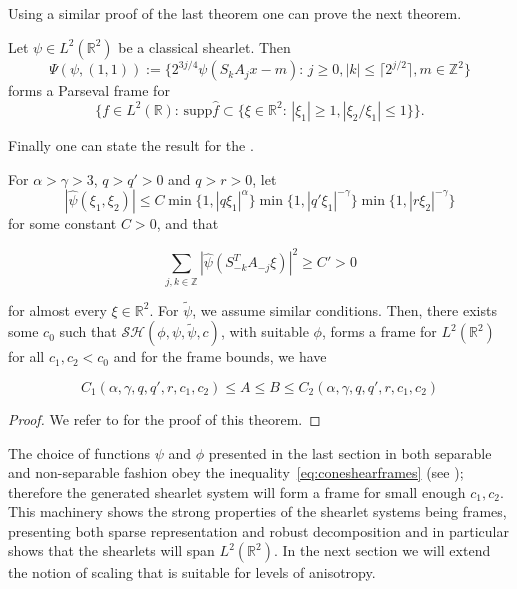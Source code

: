 Using a similar proof of the last theorem one can prove the next theorem.

\begin{thm}
Let $\psi\in L^2(\mathbb{R}^2)$ be a classical shearlet. Then 
$$
\Psi(\psi,(1,1)):=\{2^{3j/4}\psi(S_kA_jx-m)\text{: }j\geq 0,|k|\leq\lceil 2^{j/2}\rceil,m\in\mathbb{Z}^2\}
$$
forms a Parseval frame for 
$$
\{f\in L^2(\mathbb{R})\text{:  supp}\hat{f}\subset\{\xi\in\mathbb{R}^2\text{:  }|\xi_1|\geq 1,|\xi_2/\xi_1|\leq 1\}\}.
$$
\end{thm}

Finally one can state the result for the .

\begin{thm}
For $\alpha >\gamma>3$, $q>q'>0$ and $q>r>0$, let 
\begin{equation}
\label{eq:coneshearframes}
|\hat{\psi}(\xi_1,\xi_2)|\leq C\min\{1,|q\xi_1|^{\alpha}\}\min\{1,|q'\xi_1|^{-\gamma}\}\min\{1,|r\xi_2|^{-\gamma}\}
\end{equation}
for some constant $C>0$, and that

$$
\sum_{j,k\in\mathbb{Z}}|\hat{\psi}(S^T_{-k}A_{-j}\xi)|^2\geq C'>0
$$

for almost every $\xi\in\mathbb{R}^2$. For $\tilde{\psi}$, we assume similar conditions. Then, there exists some $c_0$ such that $\mathcal{SH}(\phi,\psi,\tilde{\psi},c)$, with suitable $\phi$, forms a frame for $L^2(\mathbb{R}^2)$ for all $c_1,c_2<c_0$ and for the frame bounds, we have 

$$
C_1(\alpha,\gamma,q,q',r,c_1,c_2)\leq A\leq B\leq C_2(\alpha,\gamma,q,q',r,c_1,c_2)
$$

\end{thm}
\begin{proof}
We refer to \cite{FirstShearlets} for the proof of this theorem. 
\end{proof}

The choice of functions $\psi$ and $\phi$ presented in the last section in both separable and non-separable fashion obey the inequality~\ref{eq:coneshearframes} (see \cite{Nonseparableshear}); therefore the generated shearlet system will form a frame for small enough $c_1,c_2$. This machinery shows the strong properties of the shearlet systems being frames, presenting both sparse representation and robust decomposition and in particular shows that the shearlets will span $L^2(\mathbb{R}^2)$. In the next section we will extend the notion of scaling that is suitable for levels of anisotropy. 

